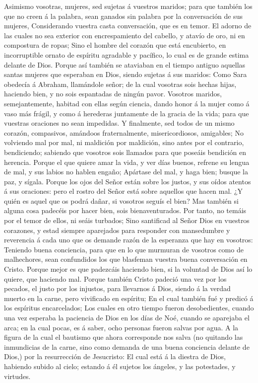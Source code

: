  Asimismo vosotras, mujeres, sed sujetas á vuestros
maridos; para que también los que no creen á la palabra, sean ganados
sin palabra por la conversación de sus mujeres, 
Considerando vuestra casta conversación, que es en temor. 
El adorno de las cuales no sea exterior con encrespamiento del cabello,
y atavío de oro, ni en compostura de ropas;  Sino el
hombre del corazón que está encubierto, en incorruptible ornato de
espíritu agradable y pacífico, lo cual es de grande estima delante de
Dios.  Porque así también se ataviaban en el tiempo
antiguo aquellas santas mujeres que esperaban en Dios, siendo sujetas á
sus maridos:  Como Sara obedecía á Abraham, llamándole
señor; de la cual vosotras sois hechas hijas, haciendo bien, y no sois
espantadas de ningún pavor.  Vosotros maridos,
semejantemente, habitad con ellas según ciencia, dando honor á la mujer
como á vaso más frágil, y como á herederas juntamente de la gracia de la
vida; para que vuestras oraciones no sean impedidas.  Y
finalmente, sed todos de un mismo corazón, compasivos, amándoos
fraternalmente, misericordiosos, amigables;  No volviendo
mal por mal, ni maldición por maldición, sino antes por el contrario,
bendiciendo; sabiendo que vosotros sois llamados para que poseáis
bendición en herencia.  Porque el que quiere amar la
vida, y ver días buenos, refrene su lengua de mal, y sus labios no
hablen engaño;  Apártase del mal, y haga bien; busque la
paz, y sígala.  Porque los ojos del Señor están sobre los
justos, y sus oídos atentos á sus oraciones: pero el rostro del Señor
está sobre aquellos que hacen mal.  ¿Y quién es aquel que
os podrá dañar, si vosotros seguís el bien?  Mas también
si alguna cosa padecéis por hacer bien, sois bienaventurados. Por tanto,
no temáis por el temor de ellos, ni seáis turbados;  Sino
santificad al Señor Dios en vuestros corazones, y estad siempre
aparejados para responder con mansedumbre y reverencia á cada uno que os
demande razón de la esperanza que hay en vosotros: 
Teniendo buena conciencia, para que en lo que murmuran de vosotros como
de malhechores, sean confundidos los que blasfeman vuestra buena
conversación en Cristo.  Porque mejor es que padezcáis
haciendo bien, si la voluntad de Dios así lo quiere, que haciendo mal.
 Porque también Cristo padeció una vez por los pecados,
el justo por los injustos, para llevarnos á Dios, siendo á la verdad
muerto en la carne, pero vivificado en espíritu;  En el
cual también fué y predicó á los espíritus encarcelados; 
Los cuales en otro tiempo fueron desobedientes, cuando una vez esperaba
la paciencia de Dios en los días de Noé, cuando se aparejaba el arca; en
la cual pocas, es á saber, ocho personas fueron salvas por agua.
 A la figura de la cual el bautismo que ahora corresponde
nos salva (no quitando las inmundicias de la carne, sino como demanda de
una buena conciencia delante de Dios,) por la resurrección de
Jesucristo:  El cual está á la diestra de Dios, habiendo
subido al cielo; estando á él sujetos los ángeles, y las potestades, y
virtudes.

